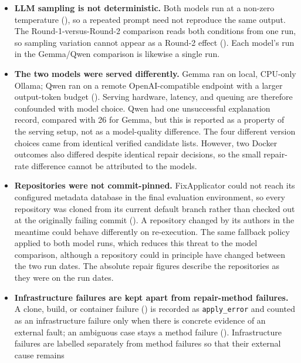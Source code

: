 \begin{itemize}
  \item \textbf{LLM sampling is not deterministic.} Both models run at a
    non-zero temperature
    (), so a repeated
    prompt need not reproduce the same output. The Round-1-versus-Round-2
    comparison reads both conditions from one run, so sampling variation
    cannot appear as a Round-2 effect (). Each
    model's run in the Gemma/Qwen comparison is likewise a single run.
  \item \textbf{The two models were served differently.} Gemma ran on
    local, CPU-only Ollama; Qwen ran on a remote OpenAI-compatible endpoint
    with a larger output-token budget ().
    Serving hardware, latency, and queuing are therefore confounded with
    model choice. Qwen had one unsuccessful explanation record, compared
    with 26 for Gemma, but this is reported as a property of the serving
    setup, not as a model-quality difference. The four different version
    choices came from identical verified candidate lists. However, two
    Docker outcomes also differed despite identical repair decisions, so
    the small repair-rate difference cannot be attributed to the models.
  \item \textbf{Repositories were not commit-pinned.} FixApplicator could
    not reach its configured metadata database in the final evaluation
    environment, so every repository was cloned from its current default
    branch rather than checked out at the originally failing commit
    (). A repository changed by its authors in
    the meantime could behave differently on re-execution. The same
    fallback policy applied to both model runs, which reduces this threat
    to the model comparison, although a repository could in principle have
    changed between the two run dates. The absolute repair figures describe
    the repositories as they were on the run dates.
  \item \textbf{Infrastructure failures are kept apart from repair-method
    failures.} A clone, build, or container failure
    () is recorded as \texttt{apply\_error} and
    counted as an infrastructure failure only when there is concrete
    evidence of an external fault; an ambiguous case stays a method failure
    (). Infrastructure failures are labelled
    separately from method failures so that their external cause remains

\end{itemize}
